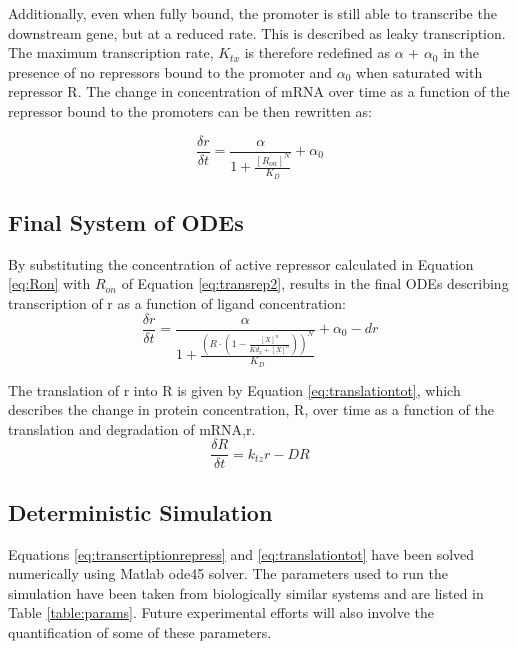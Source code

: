 Additionally, even when fully bound, the promoter is still able to transcribe the downstream gene, but at a reduced rate. This is described as leaky transcription. The maximum transcription rate, $K_{tx}$ is therefore redefined as $\alpha$ + $\alpha_{0}$ in the presence of no repressors bound to the promoter and $\alpha_{0}$ when saturated with repressor R. The change in concentration of mRNA over time as a function of the repressor bound to the promoters can be then rewritten as:
    
\begin{equation}
    \frac{\delta r}{\delta t} = \frac{\alpha}{1 + \frac{[R_{on}]^{N}}{K_D}} + \alpha_{0}
\end{equation}

\subsection{Final System of ODEs}
By substituting the concentration of active repressor calculated in Equation \ref{eq:Ron} with $R_{on}$ of Equation \ref{eq:transrep2}, results in the final ODEs describing transcription of r as a function of ligand concentration: 
\begin{equation}
\label{eq:transcrtiptionrepress}
    \frac{\delta r}{\delta t} = \frac{\alpha}{1 + \frac{(R\cdot(1 - \frac{[X]^n}{Kd_{x} + [X]^n}))^{N}}{K_D}} + \alpha_{0} - dr
\end{equation}

The translation of r into R is given by Equation \ref{eq:translationtot}, which describes the change in protein concentration, R, over time as a function of the translation and degradation of mRNA,r.
\begin{equation}
\label{eq:translationtot}
    \frac{\delta R}{\delta t} = k_{tz}r - DR
\end{equation}


\subsection{Deterministic Simulation}
Equations \ref{eq:transcrtiptionrepress} and \ref{eq:translationtot} have been solved numerically using Matlab ode45 solver. The parameters used to run the simulation have been taken from biologically similar systems and are listed in Table \ref{table:params}. Future experimental efforts will also involve the quantification of some of these parameters.

